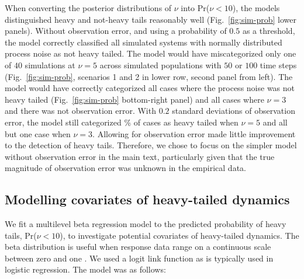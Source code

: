 When converting the posterior distributions of $\nu$ into Pr($\nu < 10$), the
models distinguished heavy and not-heavy tails reasonably well
(Fig.~\ref{fig:sim-prob} lower panels). Without observation error, and using a
probability of $0.5$ as a threshold, the model correctly classified all
simulated systems with normally distributed process noise as not heavy tailed.
The model would have miscategorized only one of $40$ simulations at $\nu = 5$
across simulated populations with $50$ or $100$ time steps
(Fig.~\ref{fig:sim-prob}, scenarios 1 and 2 in lower row, second panel from
left). The model would have correctly categorized all cases where the process
noise was not heavy tailed (Fig.~\ref{fig:sim-prob} bottom-right panel) and
all cases where $\nu = 3$ and there was not observation error. With $0.2$
standard deviations of observation error, the model still categorized
\obsErrorNuFivePerc\% of cases as heavy tailed when $\nu = 5$ and all but one
case when $\nu = 3$. Allowing for observation error made little improvement to
the detection of heavy tails. Therefore, we chose to focus on the simpler
model without observation error in the main text, particularly given that the
true magnitude of observation error was unknown in the empirical data.

\subsection{Modelling covariates of heavy-tailed dynamics}

We fit a multilevel beta regression model to the predicted probability of
heavy tails, Pr($\nu < 10$), to investigate potential covariates of
heavy-tailed dynamics. The beta distribution is useful when response data
range on a continuous scale between zero and one \citep{ferrari2004}. We used
a logit link function as is typically used in logistic regression. The model
was as follows:

